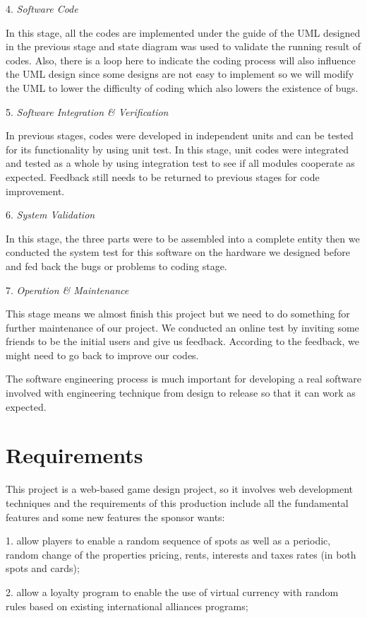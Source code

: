 \documentclass[a4paper,11pt]{article}
\begin{document}
4.	\emph{Software Code}

In this stage, all the codes are implemented under the guide of the UML designed in the previous stage and state diagram was used to validate the running result of codes. Also, there is a loop here to indicate the coding process will also influence the UML design since some designs are not easy to implement so we will modify the UML to lower the difficulty of coding which also lowers the existence of bugs.

5.	\emph{Software Integration \& Verification}

In previous stages, codes were developed in independent units and can be tested for its functionality by using unit test. In this stage, unit codes were integrated and tested as a whole by using integration test to see if all modules cooperate as expected. Feedback still needs to be returned to previous stages for code improvement.

6.	\emph{System Validation}

In this stage, the three parts were to be assembled into a complete entity then we conducted the system test for this software on the hardware we designed before and fed back the bugs or problems to coding stage.

7.	\emph{Operation \& Maintenance}

This stage means we almost finish this project but we need to do something for further maintenance of our project. We conducted an online test by inviting some friends to be the initial users and give us feedback. According to the feedback, we might need to go back to improve our codes.

The software engineering process is much important for developing a real software involved with engineering technique from design to release so that it can work as expected.

\section{Requirements}
This project is a web-based game design project, so it involves web development techniques and the requirements of this production include all the fundamental features and some new features the sponsor wants:

1.	allow players to enable a random sequence of spots as well as a periodic, random change of the properties pricing, rents, interests and taxes rates (in both spots and cards);

2.	allow a loyalty program to enable the use of virtual currency with random rules based on existing international alliances programs;
\end{document}
